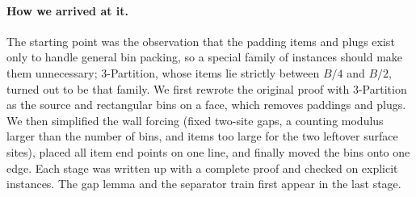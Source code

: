 \documentclass[11pt,letterpaper]{article}
\theoremstyle{definition}
\theoremstyle{remark}
\begin{document}
\paragraph{How we arrived at it.}
The starting point was the observation that the padding items and plugs exist only to handle general
bin packing, so a special family of instances should make them unnecessary; 3-Partition, whose
items lie strictly between $B/4$ and $B/2$, turned out to be that family. We first rewrote the original
proof with 3-Partition as the source and rectangular bins on a face, which removes paddings and
plugs. We then simplified the wall forcing (fixed two-site gaps, a counting modulus larger than the
number of bins, and items too large for the two leftover surface sites), placed all item end points
on one line, and finally moved the bins onto one edge. Each stage was written up with a complete
proof and checked on explicit instances. The gap lemma and the separator train first appear in the
last stage.
\end{document}
